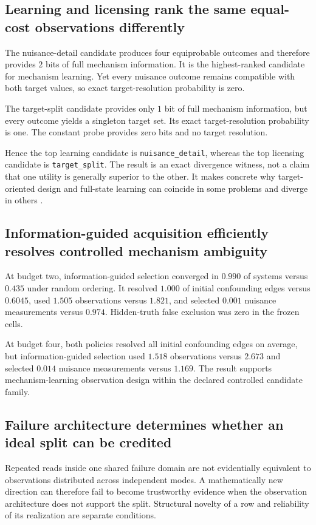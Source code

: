 \documentclass[11pt]{article}
\begin{document}
\subsection{Learning and licensing rank the same equal-cost observations differently}
The nuisance-detail candidate produces four equiprobable outcomes and therefore provides $2$ bits of full mechanism information. It is the highest-ranked candidate for mechanism learning. Yet every nuisance outcome remains compatible with both target values, so exact target-resolution probability is zero.

The target-split candidate provides only $1$ bit of full mechanism information, but every outcome yields a singleton target set. Its exact target-resolution probability is one. The constant probe provides zero bits and no target resolution.

Hence the top learning candidate is \texttt{nuisance\_detail}, whereas the top licensing candidate is \texttt{target\_split}. The result is an exact divergence witness, not a claim that one utility is generally superior to the other. It makes concrete why target-oriented design and full-state learning can coincide in some problems and diverge in others \cite{VanlierEtAl2012,AttiaEtAl2018,ZhongEtAl2026}.

\subsection{Information-guided acquisition efficiently resolves controlled mechanism ambiguity}
At budget two, information-guided selection converged in $0.990$ of systems versus $0.435$ under random ordering. It resolved $1.000$ of initial confounding edges versus $0.6045$, used $1.505$ observations versus $1.821$, and selected $0.001$ nuisance measurements versus $0.974$. Hidden-truth false exclusion was zero in the frozen cells.

At budget four, both policies resolved all initial confounding edges on average, but information-guided selection used $1.518$ observations versus $2.673$ and selected $0.014$ nuisance measurements versus $1.169$. The result supports mechanism-learning observation design within the declared controlled candidate family.

\subsection{Failure architecture determines whether an ideal split can be credited}
Repeated reads inside one shared failure domain are not evidentially equivalent to observations distributed across independent modes. A mathematically new direction can therefore fail to become trustworthy evidence when the observation architecture does not support the split. Structural novelty of a row and reliability of its realization are separate conditions.
\end{document}
